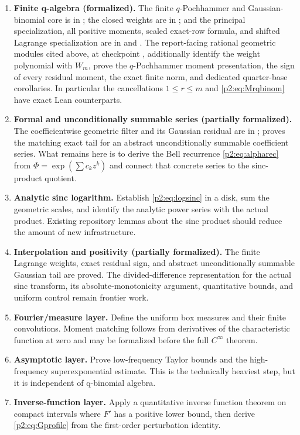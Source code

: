 \documentclass[11pt,oneside]{article}
\numberwithin{equation}{section}
\theoremstyle{definition}
\theoremstyle{remark}
\begin{document}
\begin{enumerate}[label=\arabic*.,leftmargin=9mm]
\item \textbf{Finite q-algebra (formalized).}  The finite \(q\)-Pochhammer
and Gaussian-binomial core is in ; the closed
weights are in ; and the principal
specialization, all positive moments, scaled exact-row formula, and shifted
Lagrange specialization are in  and
.  The report-facing rational geometric
modules cited above, at checkpoint
, additionally identify the
weight polynomial with \(W_m\), prove the \(q\)-Pochhammer moment presentation,
the sign of every residual moment, the exact finite norm, and dedicated
quarter-base corollaries.  In particular the
cancellations \(1\leq r\leq m\) and \eqref{p2:eq:Mrqbinom} have exact Lean
counterparts.

\item \textbf{Formal and unconditionally summable series (partially formalized).}
The coefficientwise geometric filter and its Gaussian residual are in
;  proves
the matching exact tail for an abstract unconditionally summable coefficient
series.  What remains here is to derive the Bell recurrence
\eqref{p2:eq:alpharec} from \(\Phi=\exp(\sum c_kz^k)\) and connect that concrete
series to the sinc-product quotient.

\item \textbf{Analytic sinc logarithm.} Establish \eqref{p2:eq:logsinc} in a disk,
sum the geometric scales, and identify the analytic power series with the actual
product. Existing repository lemmas about the sinc product should reduce the
amount of new infrastructure.

\item \textbf{Interpolation and positivity (partially formalized).}  The
finite Lagrange weights, exact residual sign, and abstract unconditionally
summable Gaussian tail are proved.  The divided-difference representation for
the actual sinc transform, its absolute-monotonicity argument, quantitative
bounds, and uniform control remain frontier work.

\item \textbf{Fourier/measure layer.} Define the uniform box measures and their
finite convolutions. Moment matching follows from derivatives of the
characteristic function at zero and may be formalized before the full
\(C^\infty\) theorem.

\item \textbf{Asymptotic layer.} Prove low-frequency Taylor bounds and the
high-frequency superexponential estimate. This is the technically heaviest step,
but it is independent of q-binomial algebra.

\item \textbf{Inverse-function layer.} Apply a quantitative inverse function
theorem on compact intervals where \(F'\) has a positive lower bound, then derive
\eqref{p2:eq:Gprofile} from the first-order perturbation identity.
\end{enumerate}
\end{document}
